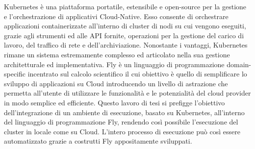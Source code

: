 Kubernetes è una piattaforma portatile, estensibile e open-source per la gestione e l'orchestrazione di applicativi Cloud-Native. Esso consente di orchestrare applicazioni containerizzate all'interno di cluster di nodi su cui vengono eseguiti, grazie agli strumenti ed alle API fornite, operazioni per la gestione del carico di lavoro, del traffico di rete e dell'archiviazione. Nonostante i vantaggi, Kubernetes rimane un sistema estremamente complesso ed articolato nella sua gestione architetturale ed implementativa. Fly è un linguaggio di programmazione domain-specific incentrato sul calcolo scientifico il cui obiettivo è quello di semplificare lo sviluppo di applicazioni su Cloud introducendo un livello di astrazione che permetta all'utente di utilizzare le funzionalità e le potenzialità del cloud provider in modo semplice ed efficiente. Questo lavoro di tesi si prefigge l'obiettivo dell'integrazione di un ambiente di esecuzione, basato su Kubernetes, all'interno del linguaggio di programmazione Fly, rendendo così possibile l'esecuzione del cluster in locale come su Cloud. L'intero processo di esecuzione può così essere automatizzato grazie a costrutti Fly appositamente sviluppati.